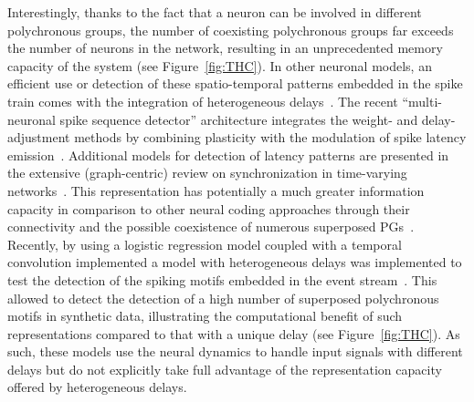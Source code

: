 \documentclass[brainsci, %
               review,submit,pdftex,moreauthors
               ]{Definitions/mdpi}
\begin{document}
Interestingly, thanks to the fact that a neuron can be involved in different polychronous groups, the number of coexisting polychronous groups far exceeds the number of neurons in the network, resulting in an unprecedented memory capacity of the system (see Figure~\ref{fig:THC}). In other neuronal models, an efficient use or detection of these spatio-temporal patterns embedded in the spike train comes with the integration of heterogeneous delays~\citep{guise_bayesian_2014,zhang_supervised_2020}. The recent ``multi-neuronal spike sequence detector'' architecture integrates the weight- and delay-adjustment methods by combining plasticity with the modulation of spike latency emission~\citep{susi_nmnsd-spiking_2021}. Additional models for detection of latency patterns are presented in the extensive (graph-centric) review on synchronization in time-varying networks~\citep{ghosh_synchronization_2021,ghosh_synchronized_2022}. This representation has potentially a much greater information capacity in comparison to other neural coding approaches through their connectivity and the possible coexistence of numerous superposed PGs~\citep{izhikevich_polychronous_2009}. Recently, by using a logistic regression model coupled with a temporal convolution implemented a model with heterogeneous delays was implemented to test the detection of the spiking motifs embedded in the event stream~\citep{grimaldi_learning_2022}. This allowed to detect the detection of a high number of superposed polychronous motifs in synthetic data, illustrating the computational benefit of such representations compared to that with a unique delay (see Figure~\ref{fig:THC}). As such, these models use the neural dynamics to handle input signals with different delays but do not explicitly take full advantage of the representation capacity offered by heterogeneous delays. 
%
%
\end{document}
